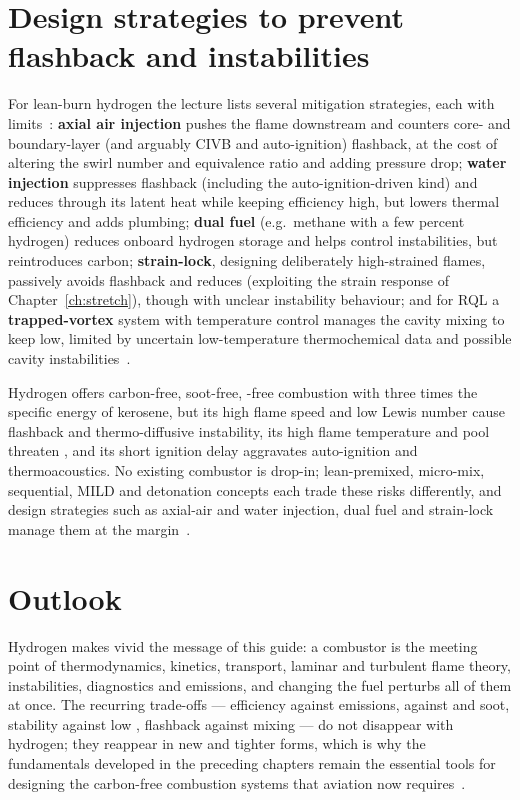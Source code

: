 \section{Design strategies to prevent flashback and instabilities}

For lean-burn hydrogen the lecture lists several mitigation strategies, each with limits~\cite{lecture14}: \textbf{axial air injection} pushes the flame downstream and counters core- and boundary-layer (and arguably CIVB and auto-ignition) flashback, at the cost of altering the swirl number and equivalence ratio and adding pressure drop; \textbf{water injection} suppresses flashback (including the auto-ignition-driven kind) and reduces  through its latent heat while keeping efficiency high, but lowers thermal efficiency and adds plumbing; \textbf{dual fuel} (e.g.\ methane with a few percent hydrogen) reduces onboard hydrogen storage and helps control instabilities, but reintroduces carbon; \textbf{strain-lock}, designing deliberately high-strained flames, passively avoids flashback and reduces  (exploiting the strain response of Chapter~\ref{ch:stretch}), though with unclear instability behaviour; and for RQL a \textbf{trapped-vortex} system with temperature control manages the cavity mixing to keep  low, limited by uncertain low-temperature thermochemical data and possible cavity instabilities~\cite{lecture14}.

\begin{keybox}
Hydrogen offers carbon-free, soot-free, -free combustion with three times the specific energy of kerosene, but its high flame speed and low Lewis number cause flashback and thermo-diffusive instability, its high flame temperature and  pool threaten , and its short ignition delay aggravates auto-ignition and thermoacoustics. No existing combustor is drop-in; lean-premixed, micro-mix, sequential, MILD and detonation concepts each trade these risks differently, and design strategies such as axial-air and water injection, dual fuel and strain-lock manage them at the margin~\cite{lecture14part1,lecture14}.
\end{keybox}

\section{Outlook}

Hydrogen makes vivid the message of this guide: a combustor is the meeting point of thermodynamics, kinetics, transport, laminar and turbulent flame theory, instabilities, diagnostics and emissions, and changing the fuel perturbs all of them at once. The recurring trade-offs --- efficiency against emissions,  against  and soot, stability against low , flashback against mixing --- do not disappear with hydrogen; they reappear in new and tighter forms, which is why the fundamentals developed in the preceding chapters remain the essential tools for designing the carbon-free combustion systems that aviation now requires~\cite{lecture14part1,lecture14}.
